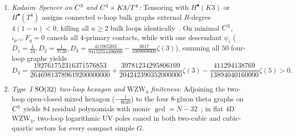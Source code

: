\begin{theorem}[Four-loop Kodaira--Spencer $D_4$, Type~I $\SO(32)$, $\mathrm{WZW}_4$, and delayed $g=4$ BCOV~{\cite{CL19,LW26,Repo9e833c8}}]
\label{thm:ks-bcov}
\leavevmode
\begin{enumerate}[label=(\arabic*),leftmargin=*]
  \item \emph{Kodaira--Spencer on $C^3$ and $C^3\times K3/T^4$:} Tensoring with $H^\bullet(K3)$ or $H^\bullet(T^4)$ assigns connected $n$-loop bulk graphs external $R$-degree $4(1-n) < 0$, killing all $n \ge 2$ bulk loops identically~\cite{FPW24}. On minimal $C^3$, $\iota_{p^{(q)}}F_q = 0$ cancels all $4$-primary contacts, while with one descendant $\psi_i$ ($D_1 = \frac{1}{24}, D_2 = \frac{1}{9720}, D_3 = \frac{411065203}{94152554496000}-\frac{3617}{1009008000}\zeta(3)$), summing all $50$ four-loop graphs yields
  \begin{equation}
  \label{eq:ks-D4-value}
  D_4 = \frac{192761752316371576853}{26469813789619200000000} + \frac{39781234295806109}{204242390352000000}\zeta(3) - \frac{411294138769}{13894040160000}\zeta(5) > 0.
  \end{equation}

  \item \emph{Type~I $\SO(32)$ two-loop hexagon and $\mathrm{WZW}_4$ finiteness:} Adjoining the two-loop open-closed mixed hexagon ($-\frac{1}{8640}$) to the four $8$-gluon theta graphs on $C^5$ yields $84$ residual polynomials with monic $\gcd = N - 32$~\cite{CL19}; in flat $4\mathrm{D}$ $\mathrm{WZW}_4$, two-loop logarithmic UV poles cancel in both two-cubic and cubic-quartic sectors for every compact simple $G$.


\end{enumerate}
\end{theorem}
